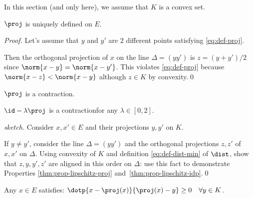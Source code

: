 In this section (and only here), we assume that $K$ is a convex set.

\begin{proposition}
  \label{thm:prop-convex-proj}
  $\proj$ is uniquely defined on $E$.
\end{proposition}

\begin{proof}
  Let's assume that $y$ and $y'$ are $2$ different points satisfying \eqref{eq:def-proj}.

  Then the orthogonal projection of $x$ on the line $\Delta=(yy')$ is $z=(y+y')/2$ since $\norm{x-y}=\norm{x-y'}$.
  This violates \eqref{eq:def-proj} because $\norm{x-z}<\norm{x-y}$ although $z\in K$ by convexity.\qed
\end{proof}

\begin{proposition}
  \label{thm:prop-lipschitz-proj}
  $\proj$ is a contraction\footnotemark[1].
\end{proposition}

\begin{proposition}
  \label{thm:prop-lipschitz-idp}
  $\id - \lambda\proj$ is a contraction\footnotemark[1] for any $\lambda \in [0,2]$.
\end{proposition}


\begin{proof}[sketch]
  Consider $x,x'\in E$ and their projections $y,y'$ on $K$.

  If $y\neq y'$, consider the line $\Delta=(yy')$ and the orthogonal projections $z,z'$ of $x,x'$ on $\Delta$.
  Using convexity of $K$ and definition \eqref{eq:def-dist-min} of $\dist$, show that $z,y,y',z'$ are aligned in this order on $\Delta$: use this fact to demonstrate Properties \ref{thm:prop-lipschitz-proj} and~\ref{thm:prop-lipschitz-idp}.\qed
\end{proof}

\begin{lemma}
  \label{thm:lemma-convex-innerprod}
  Any $x\in E$ satisfies: $\dotp{x-\proj(x)}{\proj(x)-y} \geq 0 \quad\forall y\in K$.
\end{lemma}


